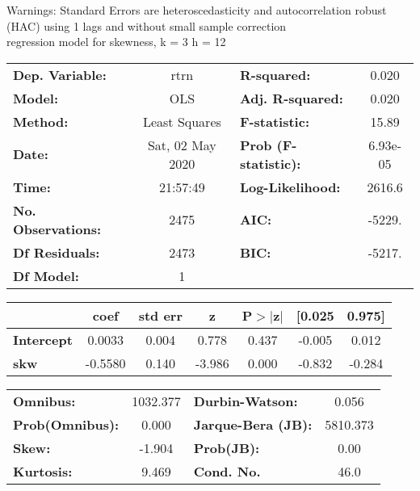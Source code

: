 Warnings: \newline
 [1] Standard Errors are heteroscedasticity and autocorrelation robust (HAC) using 1 lags and without small sample correction\\ 

regression model for skewness, k = 3 h = 12\begin{center}
\begin{tabular}{lclc}
\toprule
\textbf{Dep. Variable:}    &       rtrn       & \textbf{  R-squared:         } &     0.020   \\
\textbf{Model:}            &       OLS        & \textbf{  Adj. R-squared:    } &     0.020   \\
\textbf{Method:}           &  Least Squares   & \textbf{  F-statistic:       } &     15.89   \\
\textbf{Date:}             & Sat, 02 May 2020 & \textbf{  Prob (F-statistic):} &  6.93e-05   \\
\textbf{Time:}             &     21:57:49     & \textbf{  Log-Likelihood:    } &    2616.6   \\
\textbf{No. Observations:} &        2475      & \textbf{  AIC:               } &    -5229.   \\
\textbf{Df Residuals:}     &        2473      & \textbf{  BIC:               } &    -5217.   \\
\textbf{Df Model:}         &           1      & \textbf{                     } &             \\
\bottomrule
\end{tabular}
\begin{tabular}{lcccccc}
                   & \textbf{coef} & \textbf{std err} & \textbf{z} & \textbf{P$> |$z$|$} & \textbf{[0.025} & \textbf{0.975]}  \\
\midrule
\textbf{Intercept} &       0.0033  &        0.004     &     0.778  &         0.437        &       -0.005    &        0.012     \\
\textbf{skw}       &      -0.5580  &        0.140     &    -3.986  &         0.000        &       -0.832    &       -0.284     \\
\bottomrule
\end{tabular}
\begin{tabular}{lclc}
\textbf{Omnibus:}       & 1032.377 & \textbf{  Durbin-Watson:     } &    0.056  \\
\textbf{Prob(Omnibus):} &   0.000  & \textbf{  Jarque-Bera (JB):  } & 5810.373  \\
\textbf{Skew:}          &  -1.904  & \textbf{  Prob(JB):          } &     0.00  \\
\textbf{Kurtosis:}      &   9.469  & \textbf{  Cond. No.          } &     46.0  \\
\bottomrule
\end{tabular}
\end{center}

